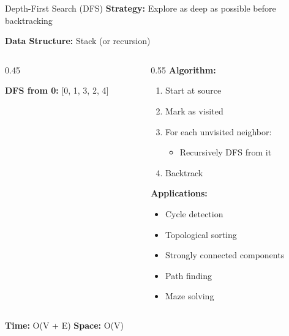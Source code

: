 \documentclass[aspectratio=169]{beamer}
\begin{document}
\begin{frame}{Depth-First Search (DFS)}
  \textbf{Strategy:} Explore as deep as possible before backtracking

  \vspace{0.3cm}
  \textbf{Data Structure:} Stack (or recursion)

  \vspace{0.3cm}
  \begin{columns}[T]
    \begin{column}{0.45\textwidth}
      \begin{center}
      \end{center}

      \textbf{DFS from 0:} [0, 1, 3, 2, 4]
    \end{column}

    \begin{column}{0.55\textwidth}
      \textbf{Algorithm:}
      \begin{enumerate}
        \item Start at source
        \item Mark as visited
        \item For each unvisited neighbor:
          \begin{itemize}
            \item Recursively DFS from it
          \end{itemize}
        \item Backtrack
      \end{enumerate}

      \vspace{0.3cm}
      \textbf{Applications:}
      \begin{itemize}
        \item Cycle detection
        \item Topological sorting
        \item Strongly connected components
        \item Path finding
        \item Maze solving
      \end{itemize}
    \end{column}
  \end{columns}

  \vspace{0.3cm}
  \textbf{Time:} O(V + E) \quad \textbf{Space:} O(V)
\end{frame}
\end{document}
